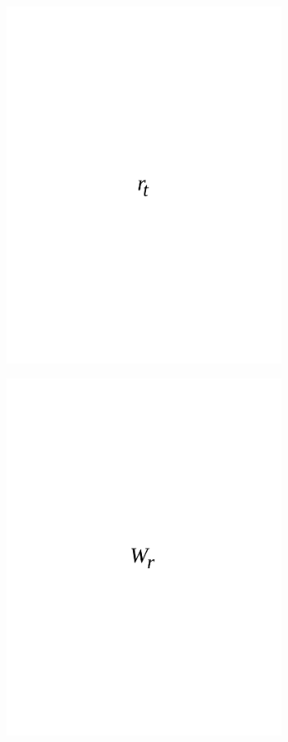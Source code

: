 \begin{figure}[H]
	\centering
	\includegraphics[width=0.8\textwidth]{media/ict/image68}
	\caption*{}
\end{figure}

\begin{figure}[H]
	\centering
	\includegraphics[width=0.8\textwidth]{media/ict/image69}
	\caption*{}
\end{figure}

